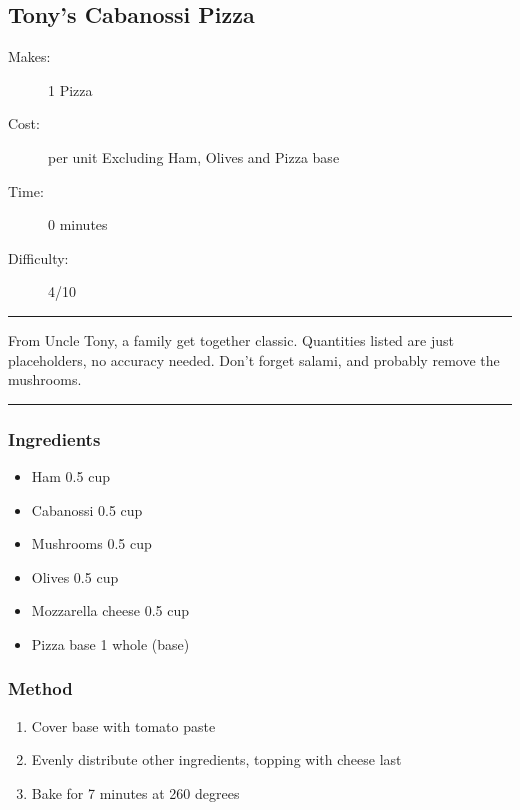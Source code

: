 \documentclass[]{article}
\begin{document}
\subsection*{\center\huge Tony's Cabanossi Pizza}
\begin{description}
\item[Makes:] 1 Pizza
\item[Cost:]  per unit Excluding Ham, Olives and Pizza base
\item[Time:] 0 minutes
\item[Difficulty:] 4/10
\end{description}
\vspace{0.2cm}\hrule\vspace{0.5cm}
\begin{adjustwidth}{0.5 cm}{0.5 cm}

From Uncle Tony, a family get together classic. Quantities listed are just placeholders, no accuracy needed. Don't forget salami, and probably remove the mushrooms. \hfill\color{accent}{\Large\faGlide\hspace{0.1cm}\faTruck\hspace{0.1cm}}\color{black}

\end{adjustwidth}
\vspace{0.5cm}\hrule
\subsubsection*{\Large Ingredients}
\begin{multicols}{2}
\begin{itemize}
 \item Ham \hfill 0.5 cup
 \item Cabanossi \hfill 0.5 cup
 \item Mushrooms \hfill 0.5 cup
 \item Olives \hfill 0.5 cup
 \item Mozzarella cheese \hfill 0.5 cup
 \item Pizza base \hfill 1 whole (base)
\end{itemize}
\end{multicols}
\subsubsection*{\Large Method}
\begin{enumerate}[font=\huge\color{accent}]
	\item Cover base with tomato paste
	\item Evenly distribute other ingredients, topping with cheese last
	\item Bake for 7 minutes at 260 degrees
\end{enumerate}
\newpage
{}\label{rec:Za'atar Munoushee}
\end{document}
